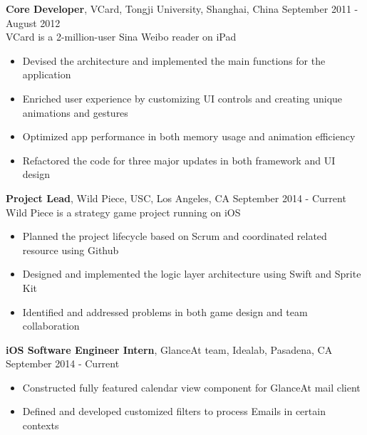 \documentclass[line, overlapped]{res}
\begin{document}
\begin{resume}
\begin{itemize}
 \end{itemize}

\textbf{Core Developer}, VCard, Tongji University, Shanghai, China \hfill September 2011 - August 2012\\
 VCard is a 2-million-user Sina Weibo reader on iPad
 \begin{itemize} \itemsep -2pt  %

  \item Devised the architecture and implemented the main functions for the application

  \item Enriched user experience by customizing UI controls and creating unique animations and gestures

  \item Optimized app performance in both memory usage and animation efficiency

  \item Refactored the code for three major updates in both framework and UI design

 \end{itemize}
 
\textbf{Project Lead}, Wild Piece, USC, Los Angeles, CA \hfill September 2014 - Current\\
Wild Piece is a strategy game project running on iOS
\begin{itemize} \itemsep -2pt %
  \item Planned the project lifecycle based on Scrum and coordinated related resource using Github
  
  \item Designed and implemented the logic layer architecture using Swift and Sprite Kit
  
  \item Identified and addressed problems in both game design and team collaboration

\end{itemize}
 
 \textbf{iOS Software Engineer Intern}, GlanceAt team, Idealab, Pasadena, CA \hfill September 2014 - Current
 \begin{itemize} \itemsep -2pt
 
 \item Constructed fully featured calendar view component for GlanceAt mail client
 
 \item Defined and developed customized filters to process Emails in certain contexts
  

\end{itemize}
\end{resume}
\end{document}
